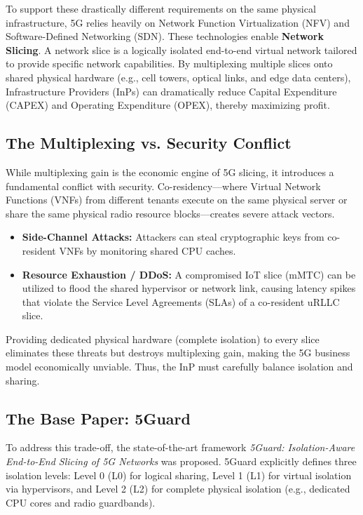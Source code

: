 \documentclass[12pt]{article}
\begin{document}
To support these drastically different requirements on the same physical infrastructure, 5G relies heavily on Network Function Virtualization (NFV) and Software-Defined Networking (SDN). These technologies enable \textbf{Network Slicing}. A network slice is a logically isolated end-to-end virtual network tailored to provide specific network capabilities. By multiplexing multiple slices onto shared physical hardware (e.g., cell towers, optical links, and edge data centers), Infrastructure Providers (InPs) can dramatically reduce Capital Expenditure (CAPEX) and Operating Expenditure (OPEX), thereby maximizing profit.

\subsection{The Multiplexing vs. Security Conflict}
While multiplexing gain is the economic engine of 5G slicing, it introduces a fundamental conflict with security. Co-residency---where Virtual Network Functions (VNFs) from different tenants execute on the same physical server or share the same physical radio resource blocks---creates severe attack vectors. 
\begin{itemize}
    \item \textbf{Side-Channel Attacks:} Attackers can steal cryptographic keys from co-resident VNFs by monitoring shared CPU caches.
    \item \textbf{Resource Exhaustion / DDoS:} A compromised IoT slice (mMTC) can be utilized to flood the shared hypervisor or network link, causing latency spikes that violate the Service Level Agreements (SLAs) of a co-resident uRLLC slice.
\end{itemize}
Providing dedicated physical hardware (complete isolation) to every slice eliminates these threats but destroys multiplexing gain, making the 5G business model economically unviable. Thus, the InP must carefully balance isolation and sharing.

\subsection{The Base Paper: 5Guard}
To address this trade-off, the state-of-the-art framework \textit{5Guard: Isolation-Aware End-to-End Slicing of 5G Networks} was proposed. 5Guard explicitly defines three isolation levels: Level 0 (L0) for logical sharing, Level 1 (L1) for virtual isolation via hypervisors, and Level 2 (L2) for complete physical isolation (e.g., dedicated CPU cores and radio guardbands). 
\end{document}

